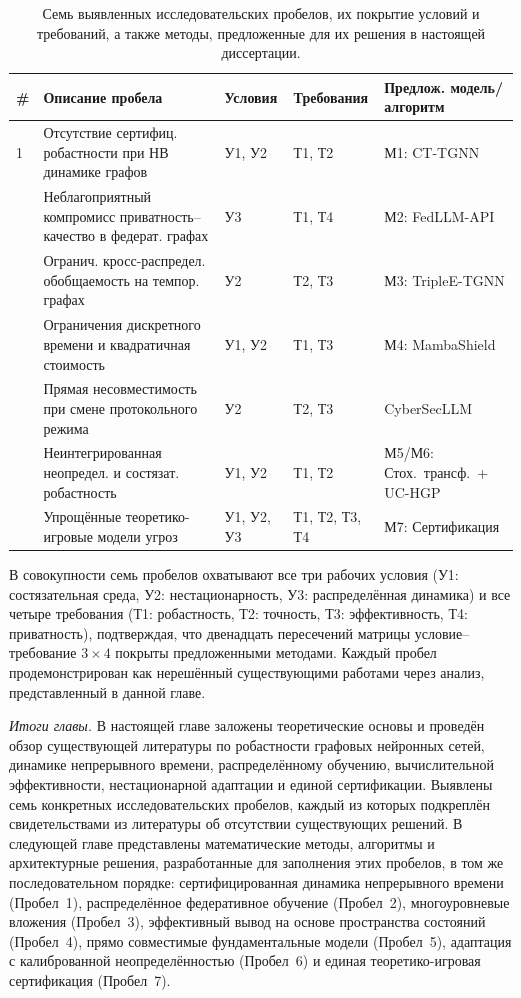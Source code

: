 \begin{table}[htbp]
\centering
\caption{Семь выявленных исследовательских пробелов, их покрытие условий и требований, а также методы, предложенные для их решения в настоящей диссертации.}
\label{tab:gaps}
\small
\begin{tabular}{p{0.5cm} p{5.5cm} p{2.5cm} p{2.0cm} p{2.5cm}}
\toprule
\textbf{\#} & \textbf{Описание пробела} & \textbf{Условия} & \textbf{Требо\-вания} & \textbf{Предлож. модель/алгоритм} \\
\midrule
1 & Отсутствие сертифиц. робастности при НВ динамике графов & У1, У2 & Т1, Т2 & М1: CT-TGNN \\
\addlinespace
2 & Неблагоприятный компромисс приватность--качество в федерат. графах & У3 & Т1, Т4 & М2: FedLLM-API \\
\addlinespace
3 & Огранич. кросс-распредел. обобщаемость на темпор. графах & У2 & Т2, Т3 & М3: TripleE-TGNN \\
\addlinespace
4 & Ограничения дискретного времени и квадратичная стоимость & У1, У2 & Т1, Т3 & М4: MambaShield \\
\addlinespace
5 & Прямая несовместимость при смене протокольного режима & У2 & Т2, Т3 & CyberSecLLM \\
\addlinespace
6 & Неинтегрированная неопредел. и состязат. робастность & У1, У2 & Т1, Т2 & М5/М6: Стох.\ трансф.\ + UC-HGP \\
\addlinespace
7 & Упрощённые теоретико-игровые модели угроз & У1, У2, У3 & Т1, Т2, Т3, Т4 & М7: Сертификация \\
\bottomrule
\end{tabular}
\end{table}

В совокупности семь пробелов охватывают все три рабочих условия (У1: состязательная среда, У2: нестационарность, У3: распределённая динамика) и все четыре требования (Т1: робастность, Т2: точность, Т3: эффективность, Т4: приватность), подтверждая, что двенадцать пересечений матрицы условие--требование $3\times4$ покрыты предложенными методами. Каждый пробел продемонстрирован как нерешённый существующими работами через анализ, представленный в данной главе.

\medskip
\noindent\textit{Итоги главы.} В настоящей главе заложены теоретические основы и проведён обзор существующей литературы по робастности графовых нейронных сетей, динамике непрерывного времени, распределённому обучению, вычислительной эффективности, нестационарной адаптации и единой сертификации. Выявлены семь конкретных исследовательских пробелов, каждый из которых подкреплён свидетельствами из литературы об отсутствии существующих решений. В следующей главе представлены математические методы, алгоритмы и архитектурные решения, разработанные для заполнения этих пробелов, в том же последовательном порядке: сертифицированная динамика непрерывного времени (Пробел~1), распределённое федеративное обучение (Пробел~2), многоуровневые вложения (Пробел~3), эффективный вывод на основе пространства состояний (Пробел~4), прямо совместимые фундаментальные модели (Пробел~5), адаптация с калиброванной неопределённостью (Пробел~6) и единая теоретико-игровая сертификация (Пробел~7).

